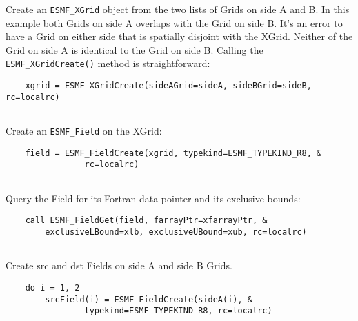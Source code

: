 
   Create an {\tt ESMF\_XGrid} object from the two lists of Grids on side A and B.
   In this example both Grids on side A overlaps with the Grid on side B. It's an error to have a Grid
   on either side that is spatially disjoint with the XGrid. Neither of the Grid on side A is
   identical to the Grid on side B. Calling the {\tt ESMF\_XGridCreate()} method is straightforward: 

 \begin{verbatim}
    xgrid = ESMF_XGridCreate(sideAGrid=sideA, sideBGrid=sideB, rc=localrc)
 
\end{verbatim}
 

   Create an {\tt ESMF\_Field} on the XGrid: 

 \begin{verbatim}
    field = ESMF_FieldCreate(xgrid, typekind=ESMF_TYPEKIND_R8, &
                rc=localrc)
 
\end{verbatim}
 

   Query the Field for its Fortran data pointer and its exclusive bounds: 

 \begin{verbatim}
    call ESMF_FieldGet(field, farrayPtr=xfarrayPtr, &
        exclusiveLBound=xlb, exclusiveUBound=xub, rc=localrc)
 
\end{verbatim}
 

   Create src and dst Fields on side A and side B Grids. 

 \begin{verbatim}
    do i = 1, 2
        srcField(i) = ESMF_FieldCreate(sideA(i), &
                typekind=ESMF_TYPEKIND_R8, rc=localrc)
 
\end{verbatim}
 

